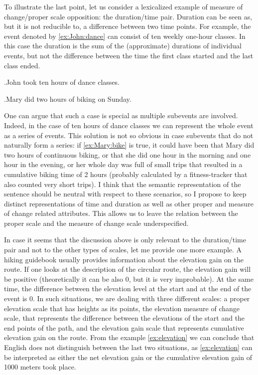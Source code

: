 To illustrate the last point, let us consider a lexicalized example of measure of change/proper scale opposition: the duration/time pair. Duration can be seen as, but it is not reducible to, a difference between two time points. For example, the event denoted by \ref{ex:John:dance} can consist of ten weekly one-hour classes. In this case the duration is the sum of the (approximate) durations of individual events, but not the difference between the time the first class started and the last class ended. 

\ex.\label{ex:John:dance}John took ten hours of dance classes.

\ex.\label{ex:Mary:bike}Mary did two hours of biking on Sunday. 

One can argue that such a case is special as multiple subevents are involved. Indeed, in the case of ten hours of dance classes we can represent the whole event as a series of events. This solution is not so obvious in case subevents that do not naturally form a series: if \ref{ex:Mary:bike} is true, it could have been that Mary did two hours of continuous biking, or that she did one hour in the morning and one hour in the evening, or her whole day was full of small trips that resulted in a cumulative biking time of 2 hours (probably calculated by a fitness-tracker that also counted very short trips). I think that the semantic representation of the sentence should be neutral with respect to these scenarios, so I propose to keep distinct representations of time and duration as well as other proper and measure of change related attributes. This allows us to leave the relation between the proper scale and the measure of change scale underspecified.

In case it seems that the discussion above is only relevant to the duration/time pair and not to the other types of scales, let me provide one more example. A hiking guidebook usually provides information about the elevation gain on the route. If one looks at the description of the circular route, the elevation gain will be positive (theoretically it can be also 0, but it is very improbable). At the same time, the difference between the elevation level at the start and at the end of the event is 0. In such situations, we are dealing with three different scales: a proper elevation scale that has heights as its points, the elevation measure of change scale, that represents the difference between the elevations of the start and the end points of the path, and the elevation gain scale that represents cumulative elevation gain on the route. From the example \ref{ex:elevation} we can conclude that English does not distinguish between the last two situations, as \ref{ex:elevation} can be interpreted as either the net elevation gain or the cumulative elevation gain of 1000 meters took place. 

